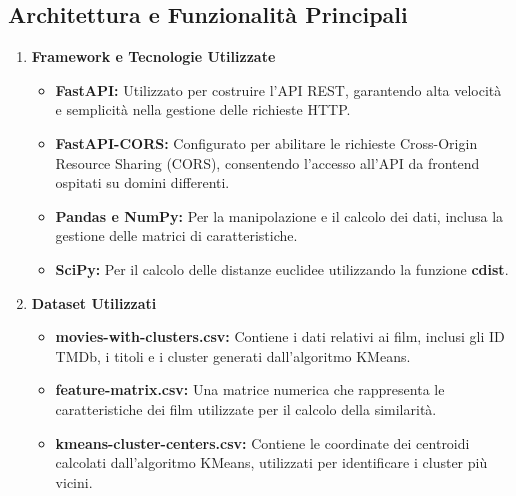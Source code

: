 \documentclass[a4paper,12pt]{article}
\begin{document}
\subsection{Architettura e Funzionalità Principali}
\begin{enumerate}
    \item \textbf{Framework e Tecnologie Utilizzate}
        \begin{itemize}
            \item \textbf{FastAPI: }Utilizzato per costruire l'API REST, garantendo alta velocità e semplicità nella gestione delle richieste HTTP.
            \item \textbf{FastAPI-CORS: }Configurato per abilitare le richieste Cross-Origin Resource Sharing (CORS), consentendo l'accesso all'API da frontend ospitati su domini differenti.
            \item \textbf{Pandas e NumPy: }Per la manipolazione e il calcolo dei dati, inclusa la gestione delle matrici di caratteristiche.
            \item \textbf{SciPy: }Per il calcolo delle distanze euclidee utilizzando la funzione \textbf{cdist}.
        \end{itemize}
    \item \textbf{Dataset Utilizzati}
        \begin{itemize}
            \item \textbf{movies-with-clusters.csv: }Contiene i dati relativi ai film, inclusi gli ID TMDb, i titoli e i cluster generati dall'algoritmo KMeans.
            \item \textbf{feature-matrix.csv: }Una matrice numerica che rappresenta le caratteristiche dei film utilizzate per il calcolo della similarità.
            \item \textbf{kmeans-cluster-centers.csv: }Contiene le coordinate dei centroidi calcolati dall'algoritmo KMeans, utilizzati per identificare i cluster più vicini.
        \end{itemize}
\end{enumerate}
\end{document}
